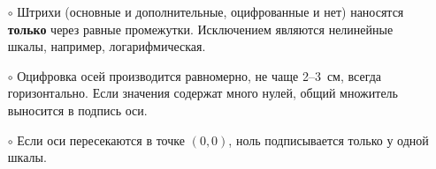 \begin{itemize}
\begin{figure}[h!]
\begin{subcaptionblock}[t]{0.46\tw}
        \caption{График занимает существенно меньше 70\% области построения, выходит за пределы области построение~--- вылезает за край горизонтальной оси.}   
    \end{subcaptionblock}
    \hfill\!\!\!~
    \caption{Пример {\bfseries хорошего} и {\bfseries плохого} расположения графика за счет выбора масштаба осей и точки их пересечения.}
    \label{pic:plot-scale}
\end{figure}

    \item[$\circ$] Штрихи (основные и дополнительные, оцифрованные и нет) наносятся {\bfseries только} через равные промежутки. Исключением являются нелинейные шкалы, например, логарифмическая.
    \item[$\circ$] Оцифровка осей производится равномерно, не чаще 2--3~см, всегда горизонтально. Если значения содержат много нулей, общий множитель выносится в подпись оси.
    \item[$\circ$] Если оси пересекаются в точке $(0,0)$, ноль подписывается только у одной шкалы.
    

\end{itemize}
